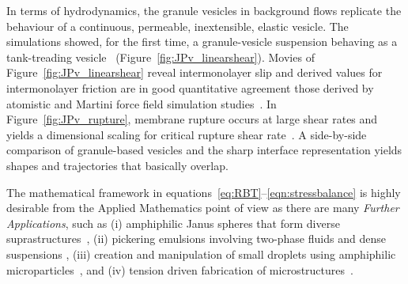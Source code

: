 In terms of hydrodynamics, the granule vesicles in background flows
replicate the behaviour of a continuous, permeable, inextensible,
elastic vesicle. The simulations showed, for the first time, a
granule-vesicle suspension behaving as a tank-treading
vesicle~\cite{Finken2008, Shaqfeh11} (Figure~\ref{fig:JPv_linearshear}).
Movies of Figure~\ref{fig:JPv_linearshear} reveal intermonolayer slip
and derived values for intermonolayer friction are in good quantitative
agreement those derived by atomistic and Martini force field simulation
studies~\cite{WuoEd06, denOtter2007, SHKULIPA2005823, Zgorski2019}. In
Figure~\ref{fig:JPv_rupture}, membrane rupture occurs at large shear
rates and yields a dimensional scaling for critical rupture shear
rate~\cite{VLAHOVSKA2009775, keller_skalak_1982}. A side-by-side
comparison of granule-based vesicles and the sharp interface
representation yields shapes and trajectories that basically overlap.

The mathematical framework in
equations~\eqref{eq:RBT}--\eqref{eqn:stressbalance} is highly desirable
from the Applied Mathematics point of view as there are many
\emph{Further Applications}, such as (i) amphiphilic Janus spheres that
form diverse suprastructures~\cite{HaBr20, McBr21, Bradley2017}, (ii)
pickering emulsions involving two-phase fluids and dense suspensions
\cite{Bradley2016}, (iii) creation and manipulation of small droplets
using amphiphilic microparticles~\cite{Ha2022SurfaceEM,
Ha2020MinimalSC}, and (iv) tension driven fabrication of
microstructures~\cite{Dasgupta2017, Leong2007, Reynolds2019, Cho2010,
Zeng20223DprintedMT, Russell2016EnergyLF}.

